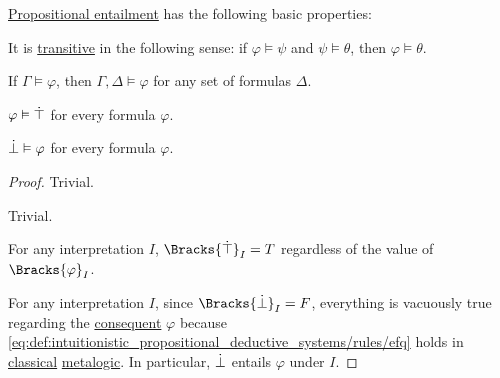 \begin{proposition}\label{thm:def:propositional_entailment}
  \hyperref[def:propositional_entailment]{Propositional entailment} has the following basic properties:
  \begin{thmenum}
     It is \hyperref[def:binary_relation/transitive]{transitive} in the following sense: if \( \varphi \vDash \psi \) and \( \psi \vDash \theta \), then \( \varphi \vDash \theta \).

     If \( \Gamma \vDash \varphi \), then \( \Gamma, \Delta \vDash \varphi \) for any set of formulas \( \Delta \).

     \( \varphi \vDash \dot\top \) for every formula \( \varphi \).

     \( \dot\bot \vDash \varphi \) for every formula \( \varphi \).
  \end{thmenum}
\end{proposition}
\begin{proof}
   Trivial.

   Trivial.

   For any interpretation \( I \), \( \Bracks{\syntop}_I = T \) regardless of the value of \( \Bracks{\varphi}_I \).

   For any interpretation \( I \), since \( \Bracks{\synbot}_I = F \), everything is vacuously true regarding the \hyperref[def:conditional_formula/consequent]{consequent} \( \varphi \) because \eqref{eq:def:intuitionistic_propositional_deductive_systems/rules/efq} holds in \hyperref[def:classical_logic]{classical} \hyperref[con:metalogic]{metalogic}. In particular, \( \dot\bot \) entails \( \varphi \) under \( I \).
\end{proof}

